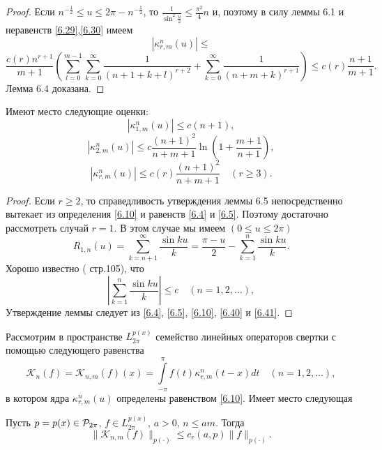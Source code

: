 \begin{proof}

 Если $n^{-\frac12}\le u\le2\pi-n^{-\frac12}$, то
  $\frac{1}{\sin^2\frac u2}\le\frac{\pi^2}{4}n$ и, поэтому в силу леммы 6.1
  и неравенств \eqref{6.29},\eqref{6.30} имеем
$$
|\kappa_{r,m}^n(u)|\le
$$
$$
\frac{c(r)n^{r+1}}{m+1}\left(\sum\limits_{l=0}^{m-1}
\sum\limits_{k=0}^{\infty}\frac{1}{(n+1+k+l)^{r+2}}+
\sum\limits_{k=0}^{\infty}\frac{1}{(n+m+k)^{r+1}}\right)\le c(r)\frac{n+1}{m+1}.
$$
 Лемма 6.4 доказана.
\end{proof}

\begin{lemma}\label{l6.5} Имеют место следующие оценки:
 $$|\kappa_{1,m}^{n}(u)|\le c(n+1), $$
 $$
 |\kappa_{2,m}^{n}(u)|\le c\frac{(n+1)^2}{n+m+1}\ln\left(1+\frac{m+1}{n+1}\right),
 $$
 $$
 |\kappa_{r,m}^{n}(u)|\le c(r)\frac{(n+1)^2}{n+m+1}\quad (r\ge3).
 $$
  \end{lemma}

\begin{proof}
Если $r\ge 2$, то справедливость утверждения леммы 6.5 непосредственно вытекает из определения \eqref{6.10} и равенств \eqref{6.4} и \eqref{6.5}. Поэтому достаточно рассмотреть случай $r=1$. В этом случае мы имеем $(0\le u\le2\pi)$
\begin{equation}\label{6.40}
    R_{1,n}(u)=\sum\limits_{k=n+1}^{\infty}\frac{\sin ku}{k}=
\frac{\pi-u}{2}-\sum\limits_{k=1}^{n}\frac{\sin ku}{k}.
\end{equation}
Хорошо известно  \cite{Zigmund} ( стр.105), что
\begin{equation}\label{6.41}
 \left|\sum\limits_{k=1}^{n}\frac{\sin ku}{k}\right|\le c\quad(n=1,2,\ldots),
 \end{equation}
Утверждение леммы следует из  \eqref{6.4}, \eqref{6.5}, \eqref{6.10}, \eqref{6.40} и \eqref{6.41}.
\end{proof}
Рассмотрим в пространстве $L^{p(x)}_{2\pi}$ семейство  линейных операторов свертки с помощью следующего равенства
\begin{equation}\label{6.42}
    \mathcal{K}_{n}(f)=\mathcal{K}_{n,m}(f)(x)=
\int\limits_{-\pi}^{\pi}f(t)\kappa_{r,m}^{n}(t-x)dt\quad(n=1,2,\ldots),
\end{equation}
в котором ядра $\kappa_{r,m}^{n}(u)$ определены равенством \eqref{6.10}. Имеет место следующая

\begin{lemma}\label{l6.6}
 Пусть $p=p(x)\in{\cal P}_{2\pi}$, $f\in L^{p(x)}_{2\pi}$, $a>0$, $n\le am$. Тогда
$$\|\mathcal{K}_{n,m}(f)\|_{p(\cdot)}\le c_r(a,p)\|f\|_{p(\cdot)}.$$
  \end{lemma}

